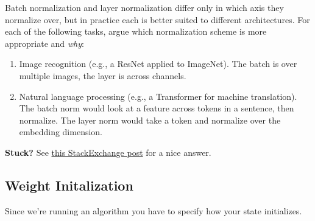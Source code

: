 \begin{problem}
	Batch normalization and layer normalization differ only in which axis they normalize over, but in practice each is better suited to different architectures.
	For each of the following tasks, argue which normalization scheme is more appropriate and \emph{why}:
	\begin{enumerate}
		\item Image recognition (e.g., a ResNet applied to ImageNet). The batch is over multiple images, the layer is across channels.
		\item Natural language processing (e.g., a Transformer for machine translation). The batch norm would look at a feature across tokens in a sentence, then normalize. The layer norm would take a token and normalize over the embedding dimension.
	\end{enumerate}
	\textbf{Stuck?} See \href{https://stats.stackexchange.com/questions/474440/why-do-transformers-use-layer-norm-instead-of-batch-norm}{this StackExchange post} for a nice answer.
\end{problem}




\subsection{Weight Initalization}
Since we're running an algorithm you have to specify how your state initializes. 

